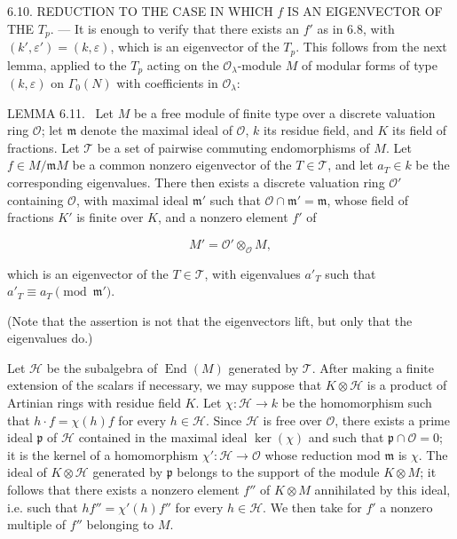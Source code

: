 \documentclass[10pt,oneside]{article}
\begin{document}
6.10. REDUCTION TO THE CASE IN WHICH \(f\) IS AN EIGENVECTOR OF THE \(T_p\). — It is enough to verify that there exists an \(f'\) as in 6.8, with \((k',\varepsilon')=(k,\varepsilon)\), which is an eigenvector of the \(T_p\). This follows from the next lemma, applied to the \(T_p\) acting on the \(\mathcal{O}_\lambda\)-module \(M\) of modular forms of type \((k,\varepsilon)\) on \(\Gamma_0(N)\) with coefficients in \(\mathcal{O}_\lambda\):\par

\noindent\textsc{LEMMA 6.11.} \textemdash\ Let \(M\) be a free module of finite type over a discrete valuation ring \(\mathcal{O}\); let \(\mathfrak m\) denote the maximal ideal of \(\mathcal{O}\), \(k\) its residue field, and \(K\) its field of fractions. Let \(\mathcal T\) be a set of pairwise commuting endomorphisms of \(M\). Let \(f\in M/\mathfrak mM\) be a common nonzero eigenvector of the \(T\in\mathcal T\), and let \(a_T\in k\) be the corresponding eigenvalues. There then exists a discrete valuation ring \(\mathcal{O}'\) containing \(\mathcal{O}\), with maximal ideal \(\mathfrak m'\) such that \(\mathcal{O}\cap\mathfrak m'=\mathfrak m\), whose field of fractions \(K'\) is finite over \(K\), and a nonzero element \(f'\) of\par

\begin{equation*}
M'=\mathcal{O}'\otimes_{\mathcal{O}}M,
\end{equation*}

which is an eigenvector of the \(T\in\mathcal T\), with eigenvalues \(a'_T\) such that \(a'_T\equiv a_T\pmod{\mathfrak m'}\).\par

(Note that the assertion is not that the eigenvectors lift, but only that the eigenvalues do.)\par

Let \(\mathcal H\) be the subalgebra of \(\operatorname{End}(M)\) generated by \(\mathcal T\). After making a finite extension of the scalars if necessary, we may suppose that \(K\otimes\mathcal H\) is a product of Artinian rings with residue field \(K\). Let \(\chi:\mathcal H\longrightarrow k\) be the homomorphism such that \(h\cdot f=\chi(h)f\) for every \(h\in\mathcal H\). Since \(\mathcal H\) is free over \(\mathcal O\), there exists a prime ideal \(\mathfrak p\) of \(\mathcal H\) contained in the maximal ideal \(\ker(\chi)\) and such that \(\mathfrak p\cap\mathcal O=0\); it is the kernel of a homomorphism \(\chi':\mathcal H\longrightarrow\mathcal O\) whose reduction mod \(\mathfrak m\) is \(\chi\). The ideal of \(K\otimes\mathcal H\) generated by \(\mathfrak p\) belongs to the support of the module \(K\otimes M\); it follows that there exists a nonzero element \(f''\) of \(K\otimes M\) annihilated by this ideal, i.e. such that \(hf''=\chi'(h)f''\) for every \(h\in\mathcal H\). We then take for \(f'\) a nonzero multiple of \(f''\) belonging to \(M\).\par
\end{document}
